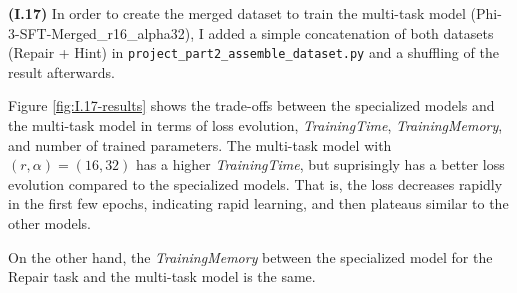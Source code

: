 \documentclass{article}
\begin{document}
\textbf{(I.17)} In order to create the merged dataset to train the multi-task model (Phi-3-SFT-Merged\_r16\_alpha32), I added a simple concatenation of both datasets (Repair + Hint) in \texttt{project\_part2\_assemble\_dataset.py} and a shuffling of the result afterwards. 

Figure \ref{fig:I.17-results} shows the trade-offs between the specialized models and the multi-task model in terms of loss evolution, \emph{TrainingTime}, \emph{TrainingMemory}, and number of trained parameters. The multi-task model with $(r, \alpha) = (16, 32)$ has a higher \emph{TrainingTime}, but suprisingly has a better loss evolution compared to the specialized models. That is, the loss decreases rapidly in the first few epochs, indicating rapid learning, and then plateaus similar to the other models. 

On the other hand, the \emph{TrainingMemory} between the specialized model for the Repair task and the multi-task model is the same.
\end{document}
